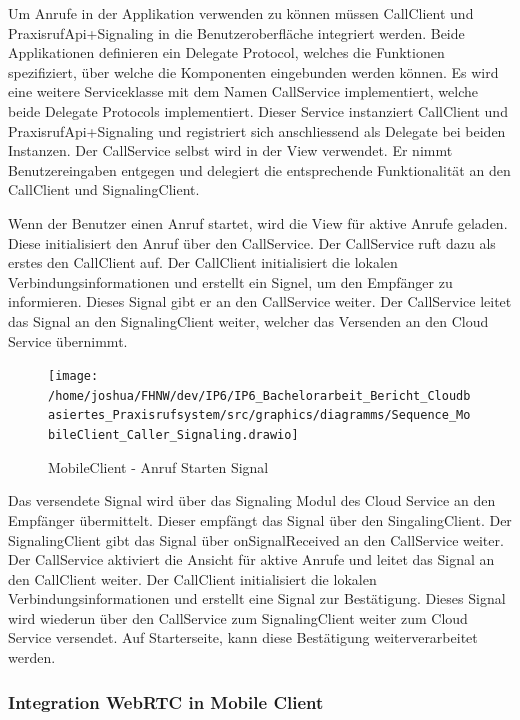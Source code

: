 Um Anrufe in der Applikation verwenden zu können müssen CallClient und PraxisrufApi+Signaling in die Benutzeroberfläche integriert werden.
Beide Applikationen definieren ein Delegate Protocol, welches die Funktionen spezifiziert, über welche die Komponenten eingebunden werden können.
Es wird eine weitere Serviceklasse mit dem Namen CallService implementiert, welche beide Delegate Protocols implementiert.
Dieser Service instanziert CallClient und PraxisrufApi+Signaling und registriert sich anschliessend als Delegate bei beiden Instanzen.
Der CallService selbst wird in der View verwendet.
Er nimmt Benutzereingaben entgegen und delegiert die entsprechende Funktionalität an den CallClient und SignalingClient.

Wenn der Benutzer einen Anruf startet, wird die View für aktive Anrufe geladen.
Diese initialisiert den Anruf über den CallService.
Der CallService ruft dazu als erstes den CallClient auf.
Der CallClient initialisiert die lokalen Verbindungsinformationen und erstellt ein Signel, um den Empfänger zu informieren.
Dieses Signal gibt er an den CallService weiter.
Der CallService leitet das Signal an den SignalingClient weiter, welcher das Versenden an den Cloud Service übernimmt.

\clearpage
\begin{figure}[h]
    \centering
    \begin{minipage}[b]{0.8\textwidth}
        \texttt{[image: /home/joshua/FHNW/dev/IP6/IP6\_Bachelorarbeit\_Bericht\_Cloudbasiertes\_Praxisrufsystem/src/graphics/diagramms/Sequence\_MobileClient\_Caller\_Signaling.drawio]}
        \caption{MobileClient - Anruf Starten Signal}
    \end{minipage}
\end{figure}

Das versendete Signal wird über das Signaling Modul des Cloud Service an den Empfänger übermittelt.
Dieser empfängt das Signal über den SingalingClient.
Der SignalingClient gibt das Signal über onSignalReceived an den CallService weiter.
Der CallService aktiviert die Ansicht für aktive Anrufe und leitet das Signal an den CallClient weiter.
Der CallClient initialisiert die lokalen Verbindungsinformationen und erstellt eine Signal zur Bestätigung.
Dieses Signal wird wiederun über den CallService zum SignalingClient weiter zum Cloud Service versendet.
Auf Starterseite, kann diese Bestätigung weiterverarbeitet werden.

\clearpage

\subsubsection{Integration WebRTC in Mobile Client}

